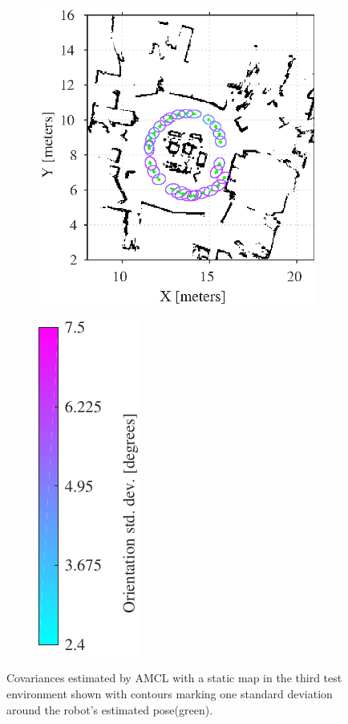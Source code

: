 \begin{figure}[htbp]
	\centering
	\begin{subfigure}[t]{0.55\textwidth}
		\includegraphics[scale=1.0]{chapters/evaluation/figures/localization_static_map3}		
	\end{subfigure}
	\begin{subfigure}[t]{0.2\textwidth}
		\includegraphics[scale=1.0]{chapters/evaluation/figures/localization_std_color_bar-crop}
	\end{subfigure}
	\caption{Covariances estimated by AMCL with a static map in the third test environment shown with contours marking one standard deviation around the robot's estimated pose(green).}
    \label{fig:amcl_covariance_static3}
\end{figure}

